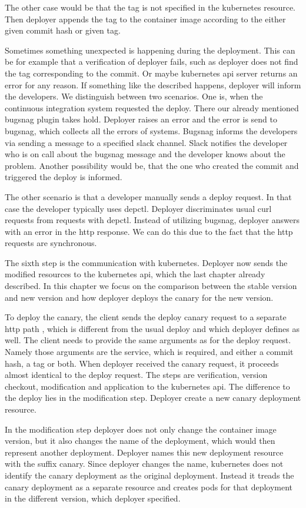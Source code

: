 The other case would be that the tag is not specified in the kubernetes resource. Then
deployer appends the tag to the container image according to the either given commit hash
or given tag.

Sometimes something unexpected is happening during the deployment. This can be for example
that a verification of deployer fails, such as deployer does not find the tag
corresponding to the commit. Or maybe kubernetes api server returns an error for any
reason. If something like the described happens, deployer will inform the developers. We
distinguish between two scenarios. One is, when the continuous integration system
requested the deploy. There our already mentioned bugsnag plugin takes hold. Deployer
raises an error and the error is send to bugsnag, which collects all the errors of
systems. Bugsnag informs the developers via sending a message to a specified slack
channel. Slack notifies the developer who is on call about the bugsnag message and the
developer knows about the problem. Another possibility would be, that the one who created
the commit and triggered the deploy is informed.

The other scenario is that a developer manually sends a deploy request. In that case
the developer typically uses depctl. Deployer discriminates usual curl requests from
requests with depctl. Instead of utilizing bugsnag, deployer answers with an error in the
http response. We can do this due to the fact that the http requests are synchronous.

The sixth step is the communication with kubernetes. Deployer now sends the modified
resources to the kubernetes api, which the last chapter already described. In this chapter
we focus on the comparison between the stable version and new version and how deployer
deploys the canary for the new version.

To deploy the canary, the client sends the deploy canary request to a separate http path ,
which is different from the usual deploy and which deployer defines as well. The client
needs to provide the same arguments as for the deploy request. Namely those arguments are
the service, which is required, and either a commit hash, a tag or both. When deployer
received the canary request, it proceeds almost identical to the deploy request. The steps
are verification, version checkout, modification and application to the kubernetes
api. The difference to the deploy lies in the modification step. Deployer create a new
canary deployment resource.

In the modification step deployer does not only change the container image version, but it
also changes the name of the deployment, which would then represent another
deployment. Deployer names this new deployment resource with the suffix canary. Since
deployer changes the name, kubernetes does not identify the canary deployment as the
original deployment. Instead it treads the canary deployment as a separate resource and
creates pods for that deployment in the different version, which deployer specified.

